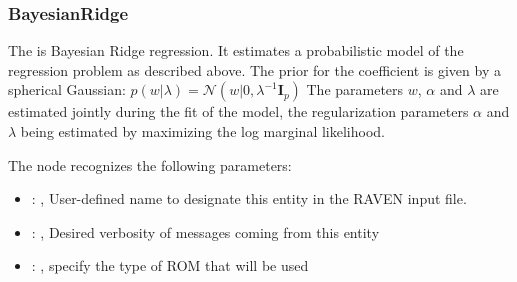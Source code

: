 \subsubsection{BayesianRidge}
  The  is Bayesian Ridge regression.                         It estimates a
  probabilistic model of the regression problem as                         described above. The
  prior for the coefficient is given by a                         spherical Gaussian:
  $p(w|\lambda) = \mathcal{N}(w|0,\lambda^{-1}\mathbf{I}_{p})$                         The
  parameters $w$, $\alpha$ and $\lambda$ are estimated jointly during                         the
  fit of the model, the regularization parameters $\alpha$ and $\lambda$
  being estimated by maximizing the log marginal likelihood.

  The  node recognizes the following parameters:
    \begin{itemize}
      \item {}: , 
        User-defined name to designate this entity in the RAVEN input file.
      \item {}: , 
        Desired verbosity of messages coming from this entity
      \item {}: , 
        specify the type of ROM that will be used
  \end{itemize}

